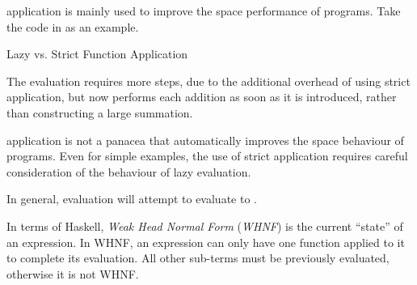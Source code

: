  application is mainly used to improve the space performance of programs.
Take the code in  as an example.

\begin{listing}[h!tbp]
\caption{Lazy vs. Strict Function Application}
\label{lst:Lazy_vs_Strict_Function_Application}
\end{listing}

The  evaluation requires more steps, due to the additional overhead of using strict application, but now performs each addition as soon as it is introduced, rather than constructing a large summation.

 application is not a panacea that automatically improves the space behaviour of programs.
Even for simple examples, the use of strict application requires careful consideration of the behaviour of lazy evaluation.

In general,  evaluation will attempt to evaluate to .

\begin{definition}\label{def:Weak_Head_Normal_Form}
  In terms of Haskell, \emph{Weak Head Normal Form} (\emph{WHNF}) is the current ``state'' of an expression.
  In WHNF, an expression can only have one function applied to it to complete its evaluation.
  All other sub-terms must be previously evaluated, otherwise it is not WHNF.
\end{definition}

